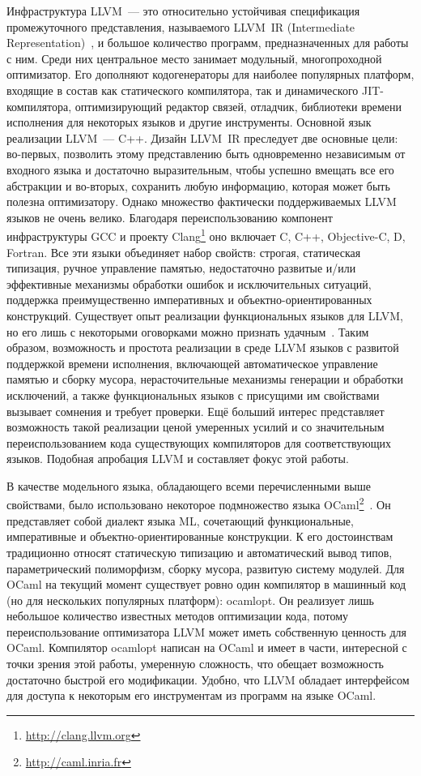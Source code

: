 \documentclass[a4paper, 12pt]{article}
\begin{document}
Инфраструктура LLVM~--- это относительно устойчивая спецификация промежуточного представления, называемого LLVM~IR
(Intermediate Representation)~\cite{LLVMIR}, и большое количество программ, предназначенных для работы с ним. Среди
них центральное место занимает модульный, многопроходной оптимизатор. Его дополняют кодогенераторы для наиболее
популярных платформ, входящие в состав как статического компилятора, так и динамического JIT-компилятора,
оптимизирующий редактор связей, отладчик, библиотеки времени исполнения для некоторых языков и другие инструменты.
Основной язык реализации LLVM~--- C++. Дизайн LLVM~IR преследует две основные цели: во-первых, позволить этому
представлению быть одновременно независимым от входного языка и достаточно выразительным, чтобы успешно вмещать все
его абстракции и во-вторых, сохранить любую информацию, которая может быть полезна оптимизатору. Однако множество
фактически поддерживаемых LLVM языков не очень велико. Благодаря переиспользованию компонент инфраструктуры GCC и
проекту
Clang\footnote{\url{http://clang.llvm.org}} оно включает C, C++, Objective-C, D, Fortran. Все эти языки объединяет набор
свойств: строгая, статическая типизация, ручное управление памятью, недостаточно развитые и/или эффективные механизмы
обработки ошибок и исключительных ситуаций, поддержка преимущественно императивных и объектно-ориентированных
конструкций. Существует опыт реализации функциональных языков для LLVM, но его лишь с некоторыми оговорками можно
признать удачным~\cite{Benner, GHC, Erlang}. Таким образом, возможность и простота реализации в среде LLVM языков
с развитой поддержкой времени исполнения, включающей автоматическое управление памятью и сборку мусора,
нерасточительные механизмы генерации и обработки исключений, а также функциональных языков с присущими им свойствами
вызывает сомнения и требует проверки. Ещё больший интерес представляет возможность такой реализации ценой умеренных
усилий и со значительным переиспользованием кода существующих компиляторов для соответствующих языков. Подобная
апробация LLVM и составляет фокус этой работы.

В качестве модельного языка, обладающего всеми перечисленными выше свойствами, было использовано некоторое подмножество
языка OCaml\footnote{\url{http://caml.inria.fr}}~\cite{Refman, RWO}. Он представляет собой диалект языка ML,
сочетающий функциональные, императивные и объектно-ориентированные конструкции. К его достоинствам традиционно относят
статическую типизацию и автоматический вывод типов, параметрический полиморфизм, сборку мусора, развитую систему
модулей. Для OCaml на текущий момент существует ровно один компилятор в машинный код (но для нескольких популярных
платформ): ocamlopt. Он реализует лишь небольшое количество известных методов оптимизации кода, потому
переиспользование оптимизатора LLVM может иметь собственную ценность для OCaml. Компилятор ocamlopt написан на OCaml
и имеет в части, интересной с точки зрения этой работы, умеренную сложность, что обещает возможность достаточно
быстрой его модификации. Удобно, что LLVM обладает интерфейсом для доступа к некоторым его инструментам из программ
на языке OCaml.
\end{document}
